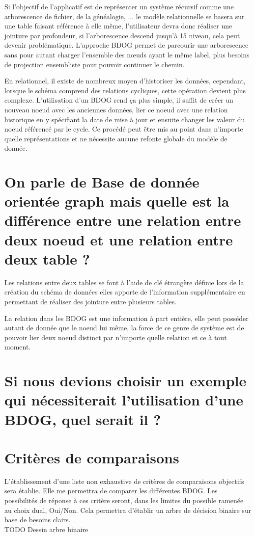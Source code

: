 \documentclass[a4paper,fleqn,12pt]{report}
\begin{document}
Si l'objectif de l'applicatif est de représenter un système récursif comme une arborescence de fichier, de la généalogie, ... le modèle relationnelle se basera sur une table faisant référence à elle même, l'utilisateur devra donc réaliser une jointure par profondeur, si l'arborescence descend jusqu'à 15 niveau, cela peut devenir problématique. L'approche BDOG permet de parcourir une arborescence sans pour autant charger l'ensemble des nœuds ayant le même label, plus besoins de projection ensembliste pour pouvoir continuer le chemin.

En relationnel, il existe de nombreux moyen d'historiser les données, cependant, lorsque le schéma comprend des relations cycliques, cette opération devient plus complexe. L'utilisation d'un BDOG rend ça plus simple, il suffit de créer un nouveau noeud avec les anciennes données, lier ce noeud avec une relation historique en y spécifiant la date de mise à jour et ensuite changer les valeur du noeud référencé par le cycle. Ce procédé peut être mis au point dans n'importe quelle représentations et ne nécessite aucune refonte globale du modèle de donnée.

\section{On parle de Base de donnée orientée graph mais quelle est la différence entre une relation entre deux noeud et une relation entre deux table ?}
Les relations entre deux tables se font à l'aide de clé étrangère définie lors de la création du schéma de données elles apporte de l'information supplémentaire en permettant de réaliser des jointure entre plusieurs tables. 

La relation dans les BDOG est une information à part entière, elle peut posséder autant de donnée que le noeud lui même, la force de ce genre de système est de pouvoir lier deux noeud distinct par n'importe quelle relation et ce à tout moment. 


\section{Si nous devions choisir un exemple qui nécessiterait l'utilisation d'une BDOG, quel serait il ?}
\section{Critères de comparaisons}
L'établissement d'une liste non exhaustive de critères de comparaisons objectifs sera établie. Elle me permettra de comparer les différentes BDOG. Les possibilités de réponse à ces critère seront, dans les limites du possible ramenée au choix dual, Oui/Non. Cela permettra d'établir un arbre de décision binaire sur base de besoins clairs.\\TODO Dessin arbre binaire
\end{document}
